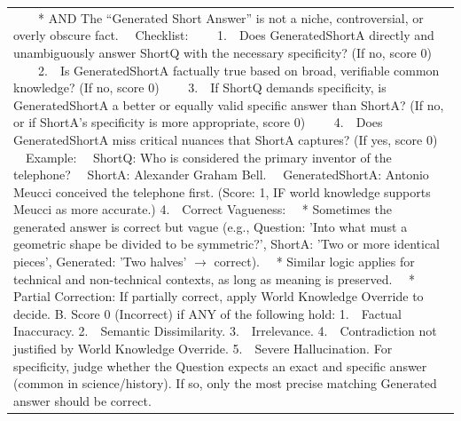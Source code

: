 \documentclass[11pt]{article}
\begin{document}
\begin{table}[t]
\begin{tabular}{@{}p{\textwidth}@{}}
{\ \ \ \ * AND The ``Generated Short Answer'' is not a niche, controversial, or overly obscure fact.\\
\ \ Checklist:\\
\ \ \ \ 1.\ \ Does GeneratedShortA directly and unambiguously answer ShortQ with the necessary specificity? (If no, score 0)\\
\ \ \ \ 2.\ \ Is GeneratedShortA factually true based on broad, verifiable common knowledge? (If no, score 0)\\
\ \ \ \ 3.\ \ If ShortQ demands specificity, is GeneratedShortA a better or equally valid specific answer than ShortA? (If no, or if ShortA's specificity is more appropriate, score 0)\\
\ \ \ \ 4.\ \ Does GeneratedShortA miss critical nuances that ShortA captures? (If yes, score 0)\\
\ \ Example:\\
\ \ ShortQ: Who is considered the primary inventor of the telephone?\\
\ \ ShortA: Alexander Graham Bell.\\
\ \ GeneratedShortA: Antonio Meucci conceived the telephone first. (Score: 1, IF world knowledge supports Meucci as more accurate.)\\
4.\ \ Correct Vagueness:\\
\ \ * Sometimes the generated answer is correct but vague (e.g., Question: 'Into what must a geometric shape be divided to be symmetric?', ShortA: 'Two or more identical pieces', Generated: 'Two halves' $\rightarrow$ correct).\\
\ \ * Similar logic applies for technical and non-technical contexts, as long as meaning is preserved.\\
\ \ * Partial Correction: If partially correct, apply World Knowledge Override to decide.\\
B. Score 0 (Incorrect) if ANY of the following hold:\\
1.\ \ Factual Inaccuracy.\\
2.\ \ Semantic Dissimilarity.\\
3.\ \ Irrelevance.\\
4.\ \ Contradiction not justified by World Knowledge Override.\\
5.\ \ Severe Hallucination.\\
For specificity, judge whether the Question expects an exact and specific answer (common in science/history). If so, only the most precise matching Generated answer should be correct.\\
}
\end{tabular}
\end{table}
\end{document}
